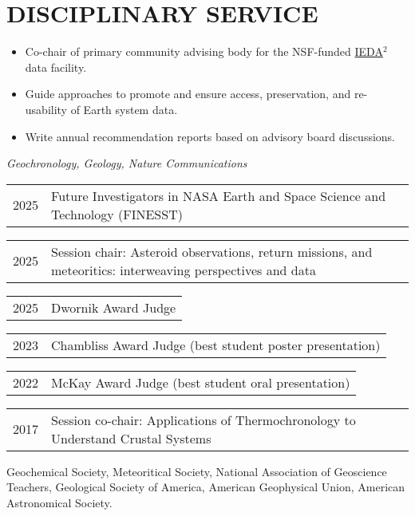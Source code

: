 \section{DISCIPLINARY SERVICE}

\begin{itemize}
	\item Co-chair of primary community advising body for the NSF-funded \href{https://www.iedadata.org/}{IEDA$^2$} data facility.
	\item Guide approaches to promote and ensure access, preservation, and re-usability of Earth system data.
	\item Write annual recommendation reports based on advisory board discussions. 
\end{itemize}

\textit{Geochronology, Geology, Nature Communications}

\begin{tabular}{ll} 
	2025 & Future Investigators in NASA Earth and Space Science and Technology (FINESST)
\end{tabular}


\begin{tabular}{ll} 
	2025 & Session chair: \small Asteroid observations, return missions, and meteoritics: interweaving perspectives and data
\end{tabular}

\begin{tabular}{ll} 
	2025 & Dwornik Award Judge
\end{tabular}

\begin{tabular}{ll} 
	2023 & Chambliss Award Judge (best student poster presentation)
\end{tabular}

\begin{tabular}{ll} 
	2022 & 	McKay Award Judge (best student oral presentation)
\end{tabular}

\begin{tabular}{ll} 
	2017 & 	Session co-chair: \small Applications of Thermochronology to Understand Crustal Systems
\end{tabular}

Geochemical Society, Meteoritical Society, National Association of Geoscience Teachers, Geological Society of America, American Geophysical Union, American Astronomical Society.